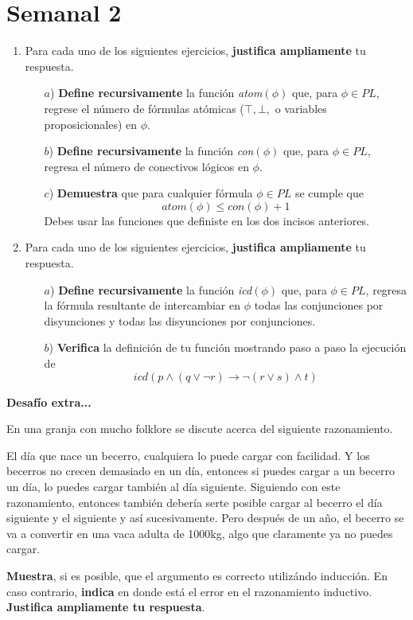 \documentclass{article}
\begin{document}
\section*{\LARGE{Semanal 2}}
\begin{enumerate}
\item Para cada uno de los siguientes ejercicios, \textbf{justifica ampliamente}
  tu respuesta.
  \begin{itemize}
  \item[$a$)] \textbf{Define recursivamente} la función \textit{atom}$(\phi)$ que,
    para $\phi \in PL$, regrese el número de fórmulas atómicas ($\top, \bot,$ o variables
    proposicionales) en $\phi$.
  \item[$b$)] \textbf{Define recursivamente} la función \textit{con}$(\phi)$ que,
    para $\phi \in PL$, regresa el número de conectivos lógicos en $\phi$.
  \item[$c$)] \textbf{Demuestra} que para cualquier fórmula $\phi \in PL$ se cumple que
    \[
    atom(\phi) \leq con(\phi) + 1
    \]
    Debes usar las funciones que definiste en los dos incisos anteriores.
  \end{itemize}
\item Para cada uno de los siguientes ejercicios, \textbf{justifica ampliamente}
  tu respuesta.
  \begin{itemize}
  \item[$a$)] \textbf{Define recursivamente} la función \textit{icd}$(\phi)$ que,
    para $\phi \in PL$, regresa la fórmula resultante de intercambiar en $\phi$
    todas las conjunciones por disyunciones y todas las disyunciones por conjunciones.
  \item[$b$)] \textbf{Verifica} la definición de tu función mostrando paso a paso
    la ejecución de
    \[
    icd(p \land (q \lor \neg r) \rightarrow \neg (r \lor s) \land t)
    \]
  \end{itemize}
\end{enumerate}

\textbf{Desafío extra...}

En una granja con mucho folklore se discute acerca del siguiente razonamiento.

\hspace*{0.5cm} \guillemotleft El día que nace un becerro, cualquiera lo puede cargar con
facilidad. Y los becerros no crecen demasiado en un día, entonces si puedes cargar a un
becerro un día, lo puedes cargar también al día siguiente. Siguiendo con este razonamiento,
entonces también debería serte posible cargar al becerro el día siguiente y el siguiente y
así sucesivamente. Pero después de un año, el becerro se va a convertir en una vaca adulta
de 1000kg, algo que claramente ya no puedes cargar.\guillemotright

\hspace*{0.5cm} \textbf{Muestra}, si es posible, que el argumento es correcto utilizándo
inducción. En caso contrario, \textbf{indica} en donde está el error en el razonamiento
inductivo. \textbf{Justifica ampliamente tu respuesta}.
\end{document}
